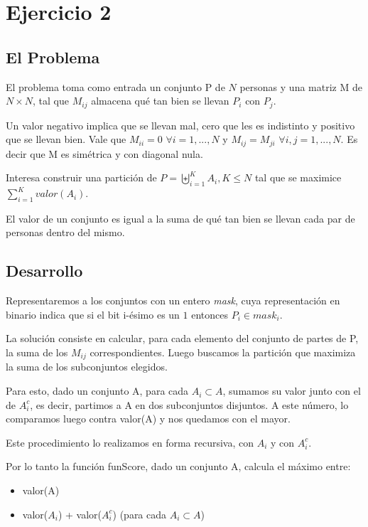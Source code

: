 \section{Ejercicio 2}

\subsection{El Problema}

El problema toma como entrada un conjunto P de $N$ personas y una matriz M de $N \times N$, tal que $M_{ij}$ almacena qu\'e tan bien se llevan $P_i$ con $P_j$.

Un valor negativo implica que se llevan mal, cero que les es indistinto y positivo que se llevan bien. Vale que $M_{ii} = 0$ $\forall i = 1,...,N$ y $M_{ij} = M_{ji}$  $\forall i,j = 1,...,N$. Es decir que M es sim\'etrica y con diagonal nula. 

Interesa construir una partici\'on de $P = \biguplus\limits_{i = 1}^{K} A_i, K \leq N$ tal que se maximice $\displaystyle\sum_{i = 1}^{K} valor(A_i)$.

El valor de un conjunto es igual a la suma de qu\'e tan bien se llevan cada par de personas dentro del mismo.

\subsection{Desarrollo}

Representaremos a los conjuntos con un entero \textit{mask}, cuya representaci\'on en binario indica que si el bit i-\'esimo es un $1$ entonces $P_i \in mask_i$.

La soluci\'on consiste en calcular, para cada elemento del conjunto de partes de P, la suma de los $M_{ij}$ correspondientes. Luego buscamos la partici\'on que maximiza la suma de los subconjuntos elegidos.

Para esto, dado un conjunto A, para cada $A_i \subset  A$, sumamos su valor junto con el de $A_i^c$, es decir, partimos a A en dos subconjuntos disjuntos. A este n\'umero, lo comparamos luego contra valor(A) y nos quedamos con el mayor.

Este procedimiento lo realizamos en forma recursiva, con $A_i$ y con $A_i^c$.

Por lo tanto la funci\'on funScore, dado un conjunto A, calcula el m\'aximo entre:

\begin{itemize}
	\item valor(A)
	\item valor($A_i$) + valor($A_i^c$) (para cada $A_i \subset A$)
\end{itemize}

